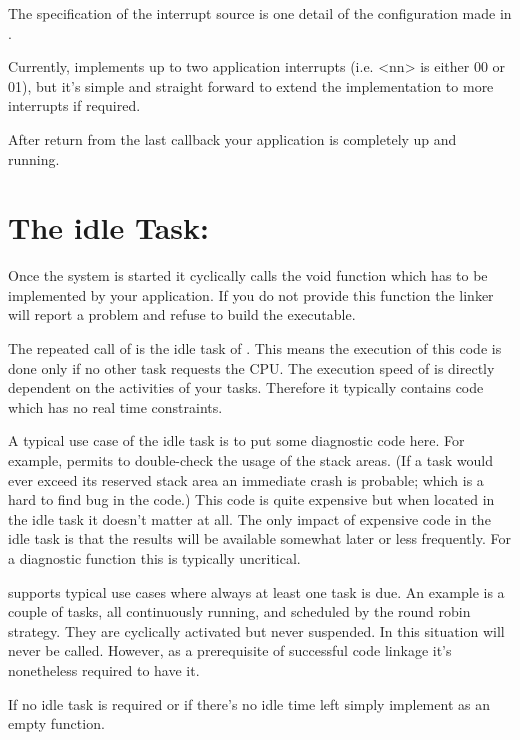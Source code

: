 The specification of the interrupt source is one detail of the \rtos{}
configuration made in .

Currently, \rtos{} implements up to two application interrupts (i.e.
\textless nn\textgreater{} is either 00 or 01), but it's simple and
straight forward to extend the implementation to more interrupts if
required.

After return from the last callback  your application is completely up and running.


\section{The idle Task: }

Once the system is started it cyclically calls the void function
 which has to be implemented by your application. If you do
not provide this function the linker will report a problem and refuse to
build the executable.

The repeated call of  is the idle task of \rtos{}. This means
the execution of this code is done only if no other task requests the
CPU. The execution speed of  is directly dependent on the
activities of your tasks. Therefore it typically contains code which has
no real time constraints.

A typical use case of the idle task is to put some diagnostic code here.
For example, \rtos{} permits to double-check the usage of the stack areas.
(If a task would ever exceed its reserved stack area an immediate crash is
probable; which is a hard to find bug in the code.) This code is quite
expensive but when located in the idle task it doesn't matter at all. The
only impact of expensive code in the idle task is that the results will be
available somewhat later or less frequently. For a diagnostic function
this is typically uncritical.

\rtos{} supports typical use cases where always at least one task is due.
An example is a couple of tasks, all continuously running, and scheduled
by the round robin strategy. They are cyclically activated but never
suspended. In this situation  will never be called. However,
as a prerequisite of successful code linkage it's nonetheless required to
have it.

If no idle task is required or if there's no idle time left simply
implement  as an empty function.


